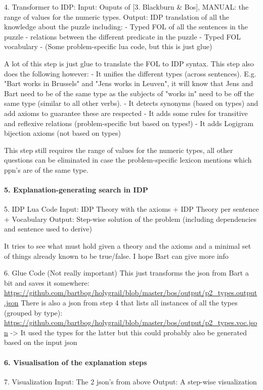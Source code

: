{


4. Transformer to IDP:
Input: Ouputs of [3. Blackburn \& Bos], MANUAL: the range of values for the numeric types.
Output: IDP translation of all the knowledge about the puzzle including:
- Typed FOL of all the sentences in the puzzle
- relations between the different predicate in the puzzle
- Typed FOL vocabulary
- (Some problem-specific lua code, but this is just glue)

A lot of this step is just glue to translate the FOL to IDP syntax. This step also does the following however:
- It unifies the different types (across sentences). E.g. "Bart works in Brussels" and "Jens works in Leuven", it will know that Jens and Bart need to be of the same type as the subjects of "works in" need to be off the same type (similar to all other verbs). 
- It detects synonyms (based on types) and add axioms to guarantee these are respected
- It adds some rules for transitive and reflexive relations (problem-specific but based on types!)
- It adds Logigram bijection axioms (not based on types)

This step still requires the range of values for the numeric types, all other questions can be eliminated in case the problem-specific lexicon mentions which ppn's are of the same type.


\paragraph{5. Explanation-generating search in IDP}



5. IDP Lua Code
Input: IDP Theory with the axioms + IDP Theory per sentence + Vocabulary
Output: Step-wise solution of the problem (including dependencies and sentence used to derive)

It tries to see what must hold given a theory and the axioms and a minimal set of things already known to be true/false. I hope Bart can give more info

6. Glue Code
(Not really important)
This just transforms the json from Bart a bit and saves it somewhere: \url{https://github.com/bartbog/holygrail/blob/master/bos/output/p2_types.output.json}
There is also a json from step 4 that lists all instances of all the types (grouped by type): \url{https://github.com/bartbog/holygrail/blob/master/bos/output/p2_types.voc.json}
-> It used the types for the latter but this could probably also be generated based on the input json

\paragraph{6. Visualisation of the explanation steps}


7. Visualization
Input: The 2 json's from above
Output: A step-wise visualization
}
